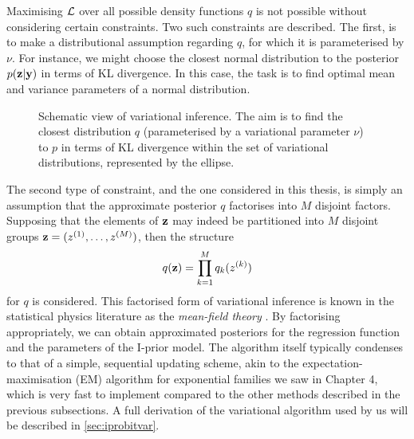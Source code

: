 Maximising ${\mathcal L}$ over all possible density functions $q$ is not possible without considering certain constraints.
Two such constraints are described. 
The first, is to make a distributional assumption regarding $q$, for which it is parameterised by $\nu$.
For instance, we might choose the closest normal distribution to the posterior $p({\mathbf z}|{\mathbf y})$ in terms of KL divergence.
In this case, the task is to find optimal mean and variance parameters of a normal distribution.

\begin{figure}[htb]
  \centering
  \caption{Schematic view of variational inference. The aim is to find the closest distribution $q$ (parameterised by a variational parameter $\nu$) to $p$ in terms of KL divergence within the set of variational distributions, represented by the ellipse.}
\end{figure}

The second type of constraint, and the one considered in this thesis, is simply an assumption that the approximate posterior $q$ factorises into $M$ disjoint factors.
Supposing that the elements of ${\mathbf z}$ may indeed be partitioned into $M$ disjoint groups ${\mathbf z} = (z^{(1)},\dots,z^{(M)})$, then the structure
\[
  q({\mathbf z}) = \prod_{k=1}^M q_k(z^{(k)})
\]
for $q$ is considered.
This factorised form of variational inference is known in the statistical physics literature as the \emph{mean-field theory} \citep{itzykson1991statistical}.
By factorising appropriately, we can obtain approximated posteriors for the regression function and the parameters of the I-prior model.
The algorithm itself typically condenses to that of a simple, sequential updating scheme, akin to the expectation-maximisation (EM) algorithm for exponential families we saw in Chapter 4, which is very fast to implement compared to the other methods described in the previous subsections.
A full derivation of the variational algorithm used by us will be described in \cref{sec:iprobitvar}.

